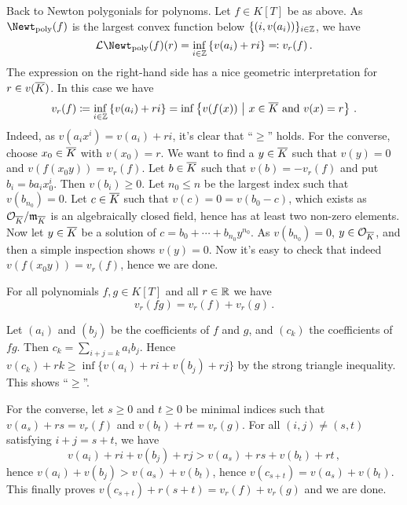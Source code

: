 \documentclass[a4paper, 10pt, oneside, DIV=9, chapterprefix=true, numbers=enddot,bibliography=totoc]{scrbook}
\begin{document}
Back to Newton polygonials for polynoms. Let $f\in K[T]$ be as above. As $\Newt_\poly(f)$ is the largest convex function below $\{(i,v(a_i))\}_{i\in \mathbb{Z}}$, we have
\begin{equation*}
	\Ll\Newt_\poly(f)(r)=\inff_{i\in\IZ}\left\{v(a_i)+ri\right\}\eqqcolon v_r(f)\,.
\end{equation*}
The expression on the right-hand side has a nice geometric interpretation for $r\in v(\ov{K})$. In this case we have
\begin{equation*}
	v_r(f)\coloneqq \inff_{i\in\IZ}\left\{v(a_i)+ri\right\}=\inff\left\{v(f(x))\st x\in\ov{K}\text{ and }v(x)=r\right\}\,.
\end{equation*}
Indeed, as $v(a_ix^i)=v(a_i)+ri$, it's clear that \enquote{$\geq $} holds. For the converse, choose $x_0\in\ov{K}$ with $v(x_0)=r$. We want to find a $y\in\ov{K}$ such that $v(y)=0$ and $v(f(x_0y))=v_r(f)$. Let $b\in \ov{K}$ such that $v(b)=-v_r(f)$ and put $b_i=ba_ix_0^i$. Then $v(b_i)\geq 0$. Let $n_0\leq n$ be the largest index such that $v(b_{n_0})=0$. Let $c\in\ov{K}$ such that $v(c)=0=v(b_0-c)$, which exists as $\Oo_{\ov{K}}/\mm_{\ov{K}}$ is an algebraically closed field, hence has at least two non-zero elements. Now let $y\in\ov{K}$ be a solution of $c=b_0+\dotsb+b_{n_0}y^{n_0}$. As $v(b_{n_0})=0$, $y\in\Oo_{\ov{K}}$, and then a simple inspection shows $v(y)=0$. Now it's easy to check that indeed $v(f(x_0y))=v_r(f)$, hence we are done. 
\begin{exc}\label{exc:vrOfProduct}
	For all polynomials $f,g\in K[T]$ and all $r\in\mathbb{R}$ we have 
	\begin{equation*}
		v_r(fg)=v_r(f)+v_r(g)\,.
	\end{equation*}
\end{exc}
\begin{proof*}
	Let $(a_i)$ and $(b_j)$ be the coefficients of $f$ and $g$, and $(c_k)$ the coefficients of $fg$. Then $c_k=\sum_{i+j=k}a_ib_j$. Hence $v(c_k)+rk\geq \inf\{v(a_i)+ri+v(b_j)+rj\}$ by the strong triangle inequality. This shows \enquote{$\geq$}. 
	
	For the converse, let $s\geq 0$ and $t\geq 0$ be minimal indices such that $v(a_s)+rs=v_r(f)$ and $v(b_t)+rt=v_r(g)$. For all $(i,j)\neq (s,t)$ satisfying $i+j=s+t$, we have 
	\begin{equation*}
		v(a_i)+ri+v(b_j)+rj>v(a_s)+rs+v(b_t)+rt\,,
	\end{equation*}
	hence $v(a_i)+v(b_j)>v(a_s)+v(b_t)$, hence $v(c_{s+t})=v(a_s)+v(b_t)$. This finally proves $v(c_{s+t})+r(s+t)=v_r(f)+v_r(g)$ and we are done.
\end{proof*}
\end{document}
